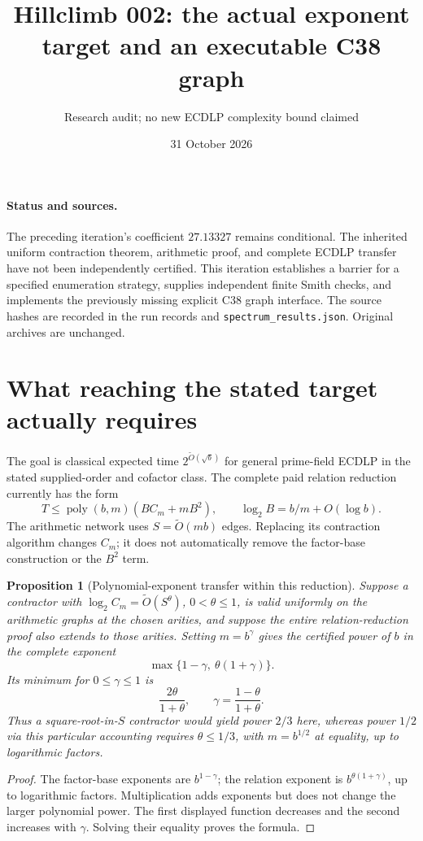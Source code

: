 \documentclass[11pt]{article}
\title{Hillclimb 002: the actual exponent target and an executable C38 graph}
\author{Research audit; no new ECDLP complexity bound claimed}
\date{31 October 2026}
\newtheorem{proposition}{Proposition}
\begin{document}
\maketitle

\paragraph{Status and sources.}
The preceding iteration's coefficient $27.13327$ remains conditional.
The inherited uniform contraction theorem, arithmetic proof, and complete
ECDLP transfer have not been independently certified. This iteration
establishes a barrier for a specified enumeration strategy, supplies
independent finite Smith checks, and implements the previously missing
explicit C38 graph interface. The source hashes are recorded in the run
records and \texttt{spectrum\_results.json}. Original archives are unchanged.

\section{What reaching the stated target actually requires}
The goal is classical expected time $2^{\widetilde O(\sqrt b)}$ for
general prime-field ECDLP in the stated supplied-order and cofactor class.
The complete paid relation reduction currently has the form
\[
 T\le\operatorname{poly}(b,m)(BC_m+mB^2),\qquad
 \log_2B=b/m+O(\log b).
\]
The arithmetic network uses $S=\widetilde O(mb)$ edges. Replacing its
contraction algorithm changes $C_m$; it does not automatically remove
the factor-base construction or the $B^2$ term.

\begin{proposition}[Polynomial-exponent transfer within this reduction]
Suppose a contractor with $\log_2 C_m=\widetilde O(S^\theta)$,
$0<\theta\le1$, is valid uniformly on the arithmetic graphs at the
chosen arities, and suppose the entire relation-reduction proof also
extends to those arities. Setting $m=b^\gamma$ gives the certified
power of $b$ in the complete exponent
\[
 \max\{1-\gamma,\ \theta(1+\gamma)\}.
\]
Its minimum for $0\le\gamma\le1$ is
\[
 \frac{2\theta}{1+\theta},\qquad
 \gamma=\frac{1-\theta}{1+\theta}.
\]
Thus a square-root-in-$S$ contractor would yield power $2/3$ here,
whereas power $1/2$ via this particular accounting requires
$\theta\le1/3$, with $m=b^{1/2}$ at equality, up to logarithmic factors.
\end{proposition}
\begin{proof}
The factor-base exponents are $b^{1-\gamma}$; the relation exponent is
$b^{\theta(1+\gamma)}$, up to logarithmic factors. Multiplication adds
exponents but does not change the larger polynomial power. The first
displayed function decreases and the second increases with $\gamma$.
Solving their equality proves the formula.
\end{proof}
\end{document}
